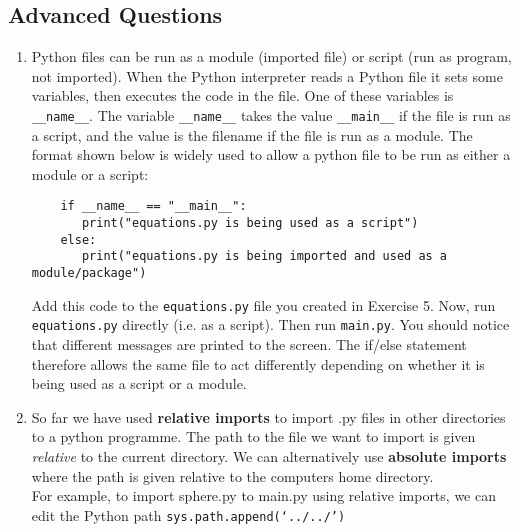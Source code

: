 \documentclass[11pt]{report}
\begin{document}
\subsection*{Advanced Questions}

\begin{enumerate}[label=(\Alph*)]
    
    \item Python files can be run as a module (imported file) or script (run as program, not imported). When the Python interpreter reads a Python file it sets some variables, then executes the code in the file. One of these variables is {\tt \_\_name\_\_}.  The variable {\tt \_\_name\_\_} takes the value {\tt \_\_main\_\_} if the file is run as a script, and the value is the filename if the file is run as a module. The format shown below is widely used to allow a python file to be run as either a module or a script:
    
    \begin{verbatim}
    if __name__ == "__main__":
       print("equations.py is being used as a script")
    else:
       print("equations.py is being imported and used as a module/package")
    \end{verbatim}
    
    Add this code to the {\tt equations.py} file you created in Exercise 5.  Now, run
    {\tt equations.py} directly (i.e. as a script).  Then run {\tt main.py}.  You
   should notice that different messages are printed to the screen.  The if/else statement
   therefore allows the same file to act differently depending on whether it is being
   used as a script or a module.
    
    
    
    
    \item So far we have used {\bf relative imports} to import .py files in other directories to a python programme. The path to the file we want to import is given {\it relative} to the current directory. We can alternatively use {\bf absolute imports} where the path is given relative to the computers home directory. \\
    For example, to import sphere.py to main.py using relative imports, we can edit the Python path {\tt sys.path.append(`../../')}
    

\end{enumerate}
\end{document}
